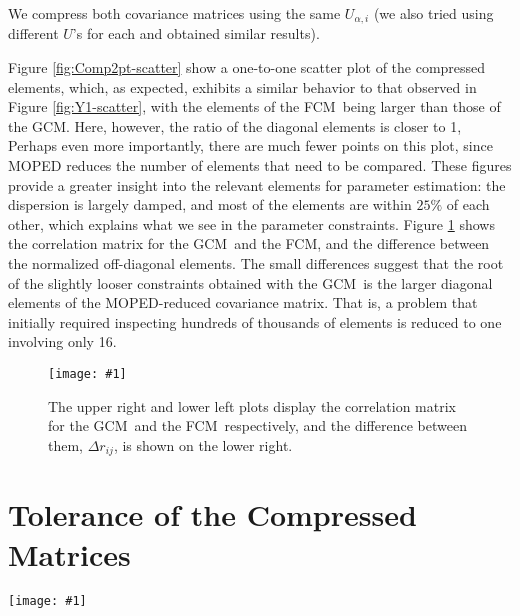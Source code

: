 \documentclass[aps, prd, twocolumn, superscriptaddress, nofootinbib, amssymb, amsmath]{revtex4-2}
\newcommand{\sfig}[2]{
	\texttt{[image: \#1]}
}
\newcommand{\Sfig}[3]{
	\begin{figure}[#1]
		\sfig{../figures/#2.pdf}{\columnwidth}
		\caption{#3}
		\label{fig:#2}
	\end{figure}
}
\newcommand{\Swide}[3]{
	\begin{figure*}[#1]
		\sfig{../figures/#2.pdf}{\textwidth}
		\caption{#3}
		\label{fig:#2}
	\end{figure*}
}
\newcommand{\rf}[1]{Figure \ref{fig:#1}}
\newcommand\full{the FCM}
\newcommand\gaussian{the GCM}
\begin{document}
We compress both covariance matrices using the same $U_{\alpha, i}$ (we also tried using different $U$'s for each and obtained similar results).

\rf{Comp2pt-scatter} show a one-to-one scatter plot of the compressed elements, which, as expected, exhibits a similar behavior to that observed in \rf{Y1-scatter}, with the elements of \full\ being larger than those of \gaussian. Here, however, the ratio of the diagonal elements is closer to 1,  Perhaps even more importantly, there are much fewer points on this plot, since MOPED reduces the number of elements that need to be compared. These figures provide a greater insight into the relevant elements for parameter estimation: the dispersion is largely damped, and most of the elements are within $25\%$ of each other, which explains what we see in the parameter constraints. \rf{Comp2pt-correlation} shows the correlation matrix for \gaussian\ and \full, and the difference between the normalized off-diagonal elements. The small differences suggest that the root of the slightly looser constraints obtained with \gaussian\ is the larger diagonal elements of the MOPED-reduced covariance matrix. That is, a problem that initially required inspecting hundreds of thousands of elements is reduced to one involving only 16.

\Sfig{thbp}{Comp2pt-correlation}{The upper right and lower left plots display the correlation matrix for \gaussian\ and \full\ respectively, and the difference between them, $\Delta r_{ij}$, is shown on the lower right.}

\section{Tolerance of the Compressed Matrices}
\label{sec:tolerance}

\Swide{thbp}{Tolerance_constraints}{An error plot showing the changes to the constraints for $\Omega_m$, $S_8$ and $A_{\text{IA}}$ for errors added at $5\%, 10\%, 15\%, 25\%, 30\%, 35\%, 40\%$ and $45\%$ of the original elements (in purple) and eigenvalues (in green) of the compressed covariance matrix. The blue rectangle covers the 68\% CL interval obtained for \full, and the darker blue vertical line shows the mean value for the respective parameter.}
\end{document}
